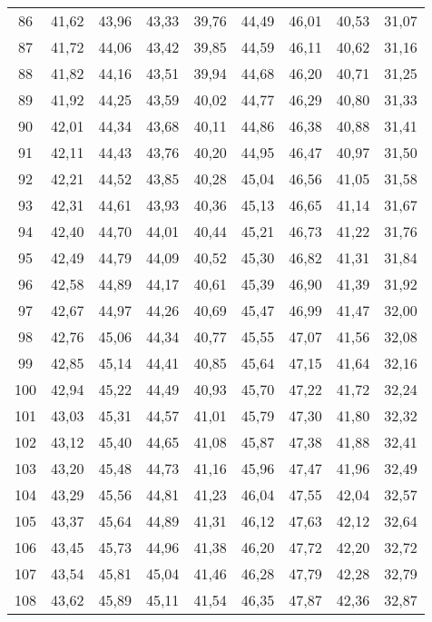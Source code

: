 \begin{longtable}{c c c c c c c c c}
      86	& 41,62	& 43,96	& 43,33	& 39,76	& 44,49	& 46,01	& 40,53	& 31,07 \\
      87	& 41,72	& 44,06	& 43,42	& 39,85	& 44,59	& 46,11	& 40,62	& 31,16 \\
      88	& 41,82	& 44,16	& 43,51	& 39,94	& 44,68	& 46,20	& 40,71	& 31,25 \\
      89	& 41,92	& 44,25	& 43,59	& 40,02	& 44,77	& 46,29	& 40,80	& 31,33 \\
      90	& 42,01	& 44,34	& 43,68	& 40,11	& 44,86	& 46,38	& 40,88	& 31,41 \\
      91	& 42,11	& 44,43	& 43,76	& 40,20	& 44,95	& 46,47	& 40,97	& 31,50 \\
      92	& 42,21	& 44,52	& 43,85	& 40,28	& 45,04	& 46,56	& 41,05	& 31,58 \\
      93	& 42,31	& 44,61	& 43,93	& 40,36	& 45,13	& 46,65	& 41,14	& 31,67 \\
      94	& 42,40	& 44,70	& 44,01	& 40,44	& 45,21	& 46,73	& 41,22	& 31,76 \\
      95	& 42,49	& 44,79	& 44,09	& 40,52	& 45,30	& 46,82	& 41,31	& 31,84 \\
      96	& 42,58	& 44,89	& 44,17	& 40,61	& 45,39	& 46,90	& 41,39	& 31,92 \\
      97	& 42,67	& 44,97	& 44,26	& 40,69	& 45,47	& 46,99	& 41,47	& 32,00 \\
      98	& 42,76	& 45,06	& 44,34	& 40,77	& 45,55	& 47,07	& 41,56	& 32,08 \\
      99	& 42,85	& 45,14	& 44,41	& 40,85	& 45,64	& 47,15	& 41,64	& 32,16 \\
      100	& 42,94	& 45,22	& 44,49	& 40,93	& 45,70	& 47,22	& 41,72	& 32,24 \\
      101	& 43,03	& 45,31	& 44,57	& 41,01	& 45,79	& 47,30	& 41,80	& 32,32 \\
      102	& 43,12	& 45,40	& 44,65	& 41,08	& 45,87	& 47,38	& 41,88	& 32,41 \\
      103	& 43,20	& 45,48	& 44,73	& 41,16	& 45,96	& 47,47	& 41,96	& 32,49 \\
      104	& 43,29	& 45,56	& 44,81	& 41,23	& 46,04	& 47,55	& 42,04	& 32,57 \\
      105	& 43,37	& 45,64	& 44,89	& 41,31	& 46,12	& 47,63	& 42,12	& 32,64 \\
      106	& 43,45	& 45,73	& 44,96	& 41,38	& 46,20	& 47,72	& 42,20	& 32,72 \\
      107	& 43,54	& 45,81	& 45,04	& 41,46	& 46,28	& 47,79	& 42,28	& 32,79 \\
      108	& 43,62	& 45,89	& 45,11	& 41,54	& 46,35	& 47,87	& 42,36	& 32,87 \\

\end{longtable}
